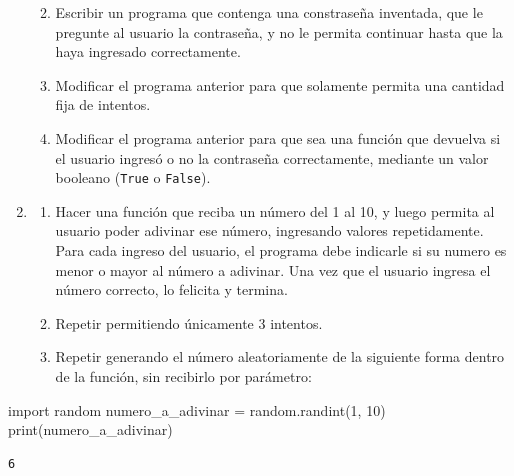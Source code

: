 \documentclass[
  letterpaper,
  DIV=11,
  numbers=noendperiod]{scrreprt}
\newenvironment{Shaded}{\begin{snugshade}}{\end{snugshade}}
\newcommand{\BuiltInTok}[1]{\textcolor[rgb]{0.00,0.23,0.31}{#1}}
\newcommand{\DecValTok}[1]{\textcolor[rgb]{0.68,0.00,0.00}{#1}}
\newcommand{\ImportTok}[1]{\textcolor[rgb]{0.00,0.46,0.62}{#1}}
\newcommand{\NormalTok}[1]{\textcolor[rgb]{0.00,0.23,0.31}{#1}}
\newcommand{\OperatorTok}[1]{\textcolor[rgb]{0.37,0.37,0.37}{#1}}
\providecommand{\tightlist}{%
  \setlength{\itemsep}{0pt}\setlength{\parskip}{0pt}}\usepackage{longtable,booktabs,array}
\begin{document}
\begin{enumerate}
  \begin{enumerate}
  \def\labelenumii{\alph{enumii}.}
  \tightlist
  \item
    Escribir un programa que contenga una constraseña inventada, que le
    pregunte al usuario la contraseña, y no le permita continuar hasta
    que la haya ingresado correctamente.
  \item
    Modificar el programa anterior para que solamente permita una
    cantidad fija de intentos.
  \item
    Modificar el programa anterior para que sea una función que devuelva
    si el usuario ingresó o no la contraseña correctamente, mediante un
    valor booleano (\texttt{True} o \texttt{False}).
  \end{enumerate}
\item
  \begin{enumerate}
  \def\labelenumii{\alph{enumii}.}
  \item
    Hacer una función que reciba un número del 1 al 10, y luego permita
    al usuario poder adivinar ese número, ingresando valores
    repetidamente. Para cada ingreso del usuario, el programa debe
    indicarle si su numero es menor o mayor al número a adivinar. Una
    vez que el usuario ingresa el número correcto, lo felicita y
    termina.
  \item
    Repetir permitiendo únicamente 3 intentos.
  \item
    Repetir generando el número aleatoriamente de la siguiente forma
    dentro de la función, sin recibirlo por parámetro:
  \end{enumerate}
\end{enumerate}

\begin{Shaded}
\begin{Highlighting}[]
\ImportTok{import}\NormalTok{ random}
\NormalTok{numero\_a\_adivinar }\OperatorTok{=}\NormalTok{ random.randint(}\DecValTok{1}\NormalTok{, }\DecValTok{10}\NormalTok{)}
\BuiltInTok{print}\NormalTok{(numero\_a\_adivinar)}
\end{Highlighting}
\end{Shaded}

\begin{verbatim}
6
\end{verbatim}
\end{document}
